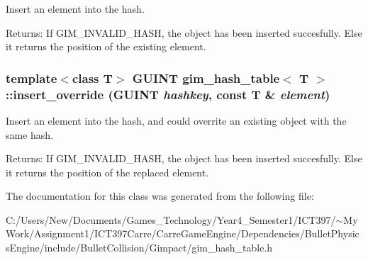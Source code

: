 Insert an element into the hash. 

\begin{Desc}
\item[Returns:]If GIM\_\-INVALID\_\-HASH, the object has been inserted succesfully. Else it returns the position of the existing element. \end{Desc}
\hypertarget{classgim__hash__table_83987136757654921c71b183de8ec55e}{
\subsubsection[insert\_\-override]{\setlength{\rightskip}{0pt plus 5cm}template$<$class T$>$ GUINT {\bf gim\_\-hash\_\-table}$<$ T $>$::insert\_\-override (GUINT {\em hashkey}, \/  const T \& {\em element})}}
\label{classgim__hash__table_83987136757654921c71b183de8ec55e}


Insert an element into the hash, and could overrite an existing object with the same hash. 

\begin{Desc}
\item[Returns:]If GIM\_\-INVALID\_\-HASH, the object has been inserted succesfully. Else it returns the position of the replaced element. \end{Desc}


The documentation for this class was generated from the following file:\begin{CompactItemize}
\item 
C:/Users/New/Documents/Games\_\-Technology/Year4\_\-Semester1/ICT397/$\sim$My Work/Assignment1/ICT397Carre/CarreGameEngine/Dependencies/BulletPhysicsEngine/include/BulletCollision/Gimpact/gim\_\-hash\_\-table.h\end{CompactItemize}
